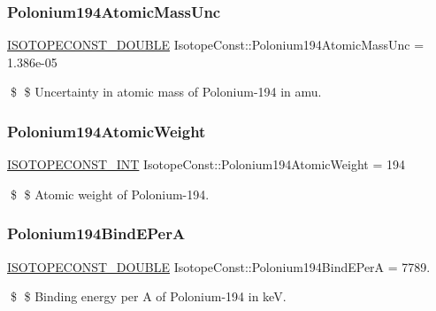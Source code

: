 \subsubsection{\texorpdfstring{Polonium194\+Atomic\+Mass\+Unc}{Polonium194AtomicMassUnc}}
{\footnotesize\ttfamily \mbox{\hyperlink{group___isotope_const-_macros_ga8f45a7272ce02c0b4c65c44636ed719a}{I\+S\+O\+T\+O\+P\+E\+C\+O\+N\+S\+T\+\_\+\+D\+O\+U\+B\+LE}} Isotope\+Const\+::\+Polonium194\+Atomic\+Mass\+Unc = 1.\+386e-\/05}

\$ \$ Uncertainty in atomic mass of Polonium-\/194 in amu. \mbox{\label{group___isotope_const-_polonium-_po194_gacafa8bcc6d2a79bb5bd829ccb2467d43}} 
\subsubsection{\texorpdfstring{Polonium194\+Atomic\+Weight}{Polonium194AtomicWeight}}
{\footnotesize\ttfamily \mbox{\hyperlink{group___isotope_const-_macros_ga5f18360b3e99483a35c32d789e62621c}{I\+S\+O\+T\+O\+P\+E\+C\+O\+N\+S\+T\+\_\+\+I\+NT}} Isotope\+Const\+::\+Polonium194\+Atomic\+Weight = 194}

\$ \$ Atomic weight of Polonium-\/194. \mbox{\label{group___isotope_const-_polonium-_po194_gae0d31a76eb8e5fb049e213f96ec0b823}} 
\subsubsection{\texorpdfstring{Polonium194\+Bind\+E\+PerA}{Polonium194BindEPerA}}
{\footnotesize\ttfamily \mbox{\hyperlink{group___isotope_const-_macros_ga8f45a7272ce02c0b4c65c44636ed719a}{I\+S\+O\+T\+O\+P\+E\+C\+O\+N\+S\+T\+\_\+\+D\+O\+U\+B\+LE}} Isotope\+Const\+::\+Polonium194\+Bind\+E\+PerA = 7789.}

\$ \$ Binding energy per A of Polonium-\/194 in keV. \mbox{\label{group___isotope_const-_polonium-_po194_gadddab8ca2b6ff8aac8a51aa3b30c8f78}} 
